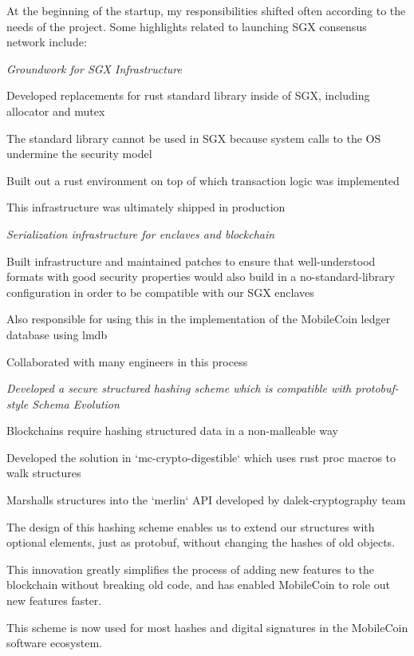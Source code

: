 \documentclass[margin,line]{resume}
\begin{document}
\begin{resume}
    At the beginning of the startup, my responsibilities shifted often according to the needs of the project.
    Some highlights related to launching SGX consensus network include:

    \textsl{Groundwork for SGX Infrastructure}
    \begin{list2}
    \item{Developed replacements for rust standard library inside of SGX, including allocator and mutex}
    \item{The standard library cannot be used in SGX because system calls to the OS undermine the security model}
    \item{Built out a rust environment on top of which transaction logic was implemented}
    \item{This infrastructure was ultimately shipped in production}
    \end{list2}

    \textsl{Serialization infrastructure for enclaves and blockchain}
    \begin{list2}
    \item{Built infrastructure and maintained patches to ensure that well-understood formats
    with good security properties would also build in a no-standard-library configuration
    in order to be compatible with our SGX enclaves}
    \item{Also responsible for using this in the implementation of the MobileCoin ledger database using lmdb}
    \item{Collaborated with many engineers in this process}
    \end{list2}

    \textsl{Developed a secure structured hashing scheme which is compatible with protobuf-style Schema Evolution}
    \begin{list2}
    \item{Blockchains require hashing structured data in a non-malleable way}
    \item{Developed the solution in `mc-crypto-digestible` which uses rust proc macros to walk structures}
    \item{Marshalls structures into the `merlin` API developed by dalek-cryptography team}
    \item{The design of this hashing scheme enables us to extend our structures with optional elements, just as protobuf,
          without changing the hashes of old objects.}
    \item{This innovation greatly simplifies the process of adding new features to the blockchain without breaking old code,
          and has enabled MobileCoin to role out new features faster.}
    \item{This scheme is now used for most hashes and digital signatures in the MobileCoin software ecosystem.}
    \end{list2}


\end{resume}
\end{document}
